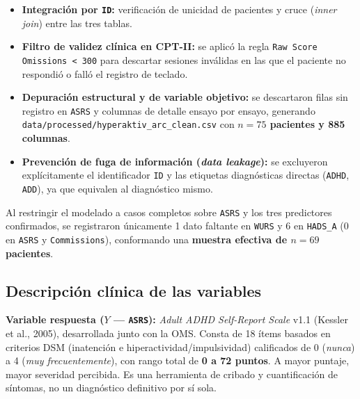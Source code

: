 \documentclass[11pt,letterpaper]{article}
\begin{document}
\begin{itemize}
  \item \textbf{Integración por \texttt{ID}:} verificación de unicidad de pacientes y cruce (\textit{inner join}) entre las tres tablas.
  \item \textbf{Filtro de validez clínica en CPT-II:} se aplicó la regla \texttt{Raw Score Omissions < 300} para descartar sesiones inválidas en las que el paciente no respondió o falló el registro de teclado.
  \item \textbf{Depuración estructural y de variable objetivo:} se descartaron filas sin registro en \texttt{ASRS} y columnas de detalle ensayo por ensayo, generando \texttt{data/processed/hyperaktiv\_arc\_clean.csv} con \textbf{$n = 75$ pacientes y 885 columnas}.
  \item \textbf{Prevención de fuga de información (\textit{data leakage}):} se excluyeron explícitamente el identificador \texttt{ID} y las etiquetas diagnósticas directas (\texttt{ADHD}, \texttt{ADD}), ya que equivalen al diagnóstico mismo.
\end{itemize}

Al restringir el modelado a casos completos sobre \texttt{ASRS} y los tres predictores confirmados, se registraron únicamente 1 dato faltante en \texttt{WURS} y 6 en \texttt{HADS\_A} (0 en \texttt{ASRS} y \texttt{Commissions}), conformando una \textbf{muestra efectiva de $n = 69$ pacientes}.

\subsection{Descripción clínica de las variables}

\textbf{Variable respuesta ($Y$ --- \texttt{ASRS}):} \textit{Adult ADHD Self-Report Scale} v1.1 (Kessler et al., 2005), desarrollada junto con la OMS. Consta de 18 ítems basados en criterios DSM (inatención e hiperactividad/impulsividad) calificados de 0 (\textit{nunca}) a 4 (\textit{muy frecuentemente}), con rango total de \textbf{0 a 72 puntos}. A mayor puntaje, mayor severidad percibida. Es una herramienta de cribado y cuantificación de síntomas, no un diagnóstico definitivo por sí sola.
\end{document}
